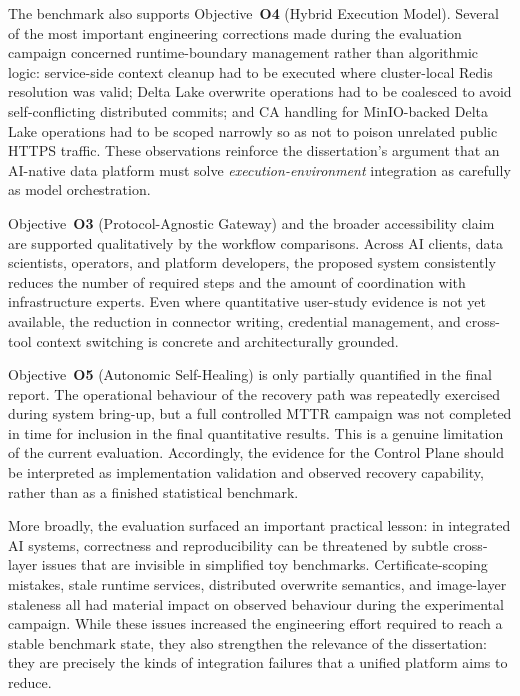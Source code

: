 \documentclass[12pt, a4paper]{report}
\begin{document}
The benchmark also supports Objective~\textbf{O4} (Hybrid Execution Model). Several
of the most important engineering corrections made during the evaluation campaign
concerned runtime-boundary management rather than algorithmic logic: service-side
context cleanup had to be executed where cluster-local Redis resolution was valid;
Delta Lake overwrite operations had to be coalesced to avoid self-conflicting
distributed commits; and CA handling for MinIO-backed Delta Lake operations had to be
scoped narrowly so as not to poison unrelated public HTTPS traffic. These observations
reinforce the dissertation's argument that an AI-native data platform must solve
\emph{execution-environment} integration as carefully as model orchestration.

Objective~\textbf{O3} (Protocol-Agnostic Gateway) and the broader accessibility claim
are supported qualitatively by the workflow comparisons. Across AI clients, data
scientists, operators, and platform developers, the proposed system consistently
reduces the number of required steps and the amount of coordination with
infrastructure experts. Even where quantitative user-study evidence is not yet
available, the reduction in connector writing, credential management, and cross-tool
context switching is concrete and architecturally grounded.

Objective~\textbf{O5} (Autonomic Self-Healing) is only partially quantified in the
final report. The operational behaviour of the recovery path was repeatedly exercised
during system bring-up, but a full controlled MTTR campaign was not completed in time
for inclusion in the final quantitative results. This is a genuine limitation of the
current evaluation. Accordingly, the evidence for the Control Plane should be
interpreted as implementation validation and observed recovery capability, rather than
as a finished statistical benchmark.

More broadly, the evaluation surfaced an important practical lesson: in integrated AI
systems, correctness and reproducibility can be threatened by subtle cross-layer
issues that are invisible in simplified toy benchmarks. Certificate-scoping mistakes,
stale runtime services, distributed overwrite semantics, and image-layer staleness all
had material impact on observed behaviour during the experimental campaign. While
these issues increased the engineering effort required to reach a stable benchmark
state, they also strengthen the relevance of the dissertation: they are precisely the
kinds of integration failures that a unified platform aims to reduce.
\end{document}
